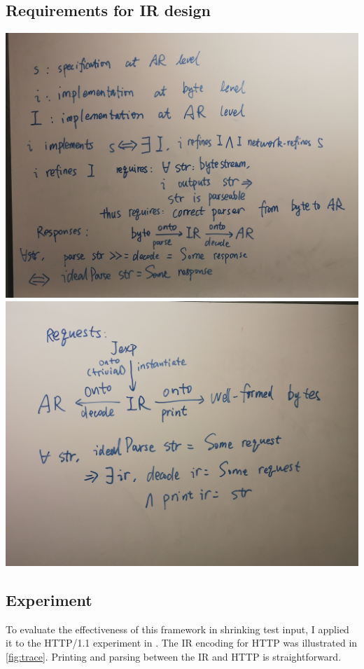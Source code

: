 \documentclass{article}
\newcommand{\http}{HTTP/1.1\xspace}
\theoremstyle{definition}
\begin{document}
\subsection{Requirements for IR design}
\enlargethispage{5\baselineskip}
\includegraphics[width=\textwidth]{figures/ir-parse}
\includegraphics[width=\textwidth]{figures/ir-print}

\subsection{Experiment}
To evaluate the effectiveness of this framework in shrinking test input, I
applied it to the \http experiment in \textcite{issta21}.  The IR encoding for
HTTP was illustrated in \autoref{fig:trace}.  Printing and parsing between the
IR and HTTP is straightforward.
\end{document}
